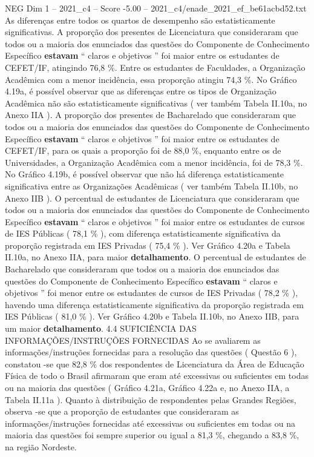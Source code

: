 \begin{textsample}{NEG Dim 1 – 2021\_c4 – Score -5.00 – 2021\_c4/enade\_2021\_ef\_be61acbd52.txt}
As diferenças entre todos os quartos de desempenho são estatisticamente significativas.
A proporção dos presentes de Licenciatura que consideraram que todos ou a maioria dos enunciados das questões do Componente de Conhecimento Específico \textbf{estavam} “ claros e objetivos ” foi maior entre os estudantes de CEFET/IF, atingindo 76,8 \%.
Entre os estudantes de Faculdades, a Organização Acadêmica com a menor incidência, essa proporção atingiu 74,3 \%.
No Gráfico 4.19a, é possível observar que as diferenças entre os tipos de Organização Acadêmica não são estatisticamente significativas ( ver também Tabela II.10a, no Anexo IIA ).
A proporção dos presentes de Bacharelado que consideraram que todos ou a maioria dos enunciados das questões do Componente de Conhecimento Específico \textbf{estavam} “ claros e objetivos ” foi maior entre os estudantes de CEFET/IF, para os quais a proporção foi de 88,0 \%, enquanto entre os de Universidades, a Organização Acadêmica com a menor incidência, foi de 78,3 \%.
No Gráfico 4.19b, é possível observar que não há diferença estatisticamente significativa entre as Organizações Acadêmicas ( ver também Tabela II.10b, no Anexo IIB ).
O percentual de estudantes de Licenciatura que consideraram que todos ou a maioria dos enunciados das questões do Componente de Conhecimento Específico \textbf{estavam} “ claros e objetivos ” foi maior entre os estudantes de cursos de IES Públicas ( 78,1 \% ), com diferença estatisticamente significativa da proporção registrada em IES Privadas ( 75,4 \% ).
Ver Gráfico 4.20a e Tabela II.10a, no Anexo IIA, para maior \textbf{detalhamento}.
O percentual de estudantes de Bacharelado que consideraram que todos ou a maioria dos enunciados das questões do Componente de Conhecimento Específico \textbf{estavam} “ claros e objetivos ” foi menor entre os estudantes de cursos de IES Privadas ( 78,2 \% ), havendo uma diferença estatisticamente significativa da proporção registrada em IES Públicas ( 81,0 \% ).
Ver Gráfico 4.20b e Tabela II.10b, no Anexo IIB, para um maior \textbf{detalhamento}. 4.4 SUFICIÊNCIA DAS INFORMAÇÕES/INSTRUÇÕES FORNECIDAS Ao se avaliarem as informações/instruções fornecidas para a resolução das questões ( Questão 6 ), constatou -se que 82,8 \% dos respondentes de Licenciatura da Área de Educação Física de todo o Brasil afirmaram que eram até excessivas ou suficientes em todas ou na maioria das questões ( Gráfico 4.21a, Gráfico 4.22a e, no Anexo IIA, a Tabela II.11a ).
Quanto à distribuição de respondentes pelas Grandes Regiões, observa -se que a proporção de estudantes que consideraram as informações/instruções fornecidas até excessivas ou suficientes em todas ou na maioria das questões foi sempre superior ou igual a 81,3 \%, chegando a 83,8 \%, na região Nordeste.

\end{textsample}
